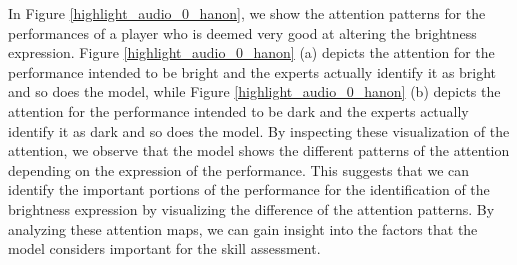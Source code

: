 \documentclass[sigconf,review,anonymous]{acmart}
\begin{document}
{%
In Figure \ref{highlight_audio_0_hanon}, we show the attention patterns for the performances of a player who is deemed very good at altering the brightness expression.
Figure \ref{highlight_audio_0_hanon} (a) depicts the attention for the performance intended to be bright and the experts actually identify it as bright and so does the model, while Figure \ref{highlight_audio_0_hanon} (b) depicts the attention for the performance intended to be dark and the experts actually identify it as dark and so does the model.
By inspecting these visualization of the attention, we observe that the model shows the different patterns of the attention depending on the expression of the performance.
This suggests that we can identify the important portions of the performance for the identification of the brightness expression by visualizing the difference of the attention patterns.
By analyzing these attention maps, we can gain insight into the factors that the model considers important for the skill assessment.

}
\end{document}
